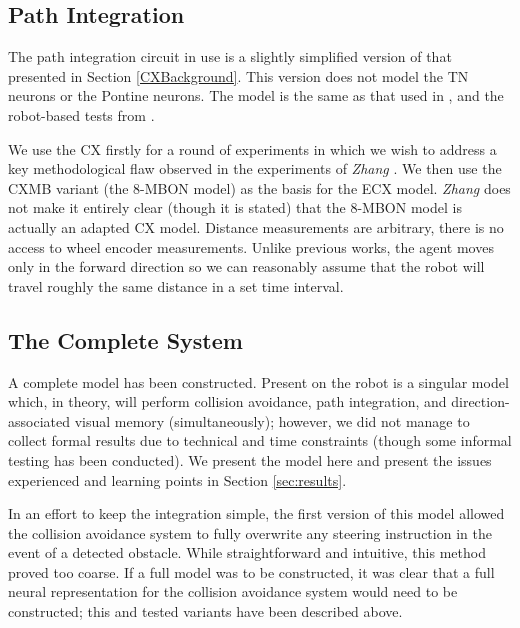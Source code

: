 \documentclass[a4paper,11pt,twoside,openright]{article}
\begin{document}
\subsection{ Path Integration }
The path integration circuit in use is a slightly simplified version of that
presented in Section \ref{CXBackground}. This version does not model the
TN neurons or the Pontine neurons. The model is the same as that used in
\cite{Scimeca2017, Zhang2017}, and the robot-based tests from \cite{Stone2017}.
\newline\par

We use the CX firstly for a round of experiments in which we wish to address a
key methodological flaw observed in the experiments of \textit{Zhang}
\cite{Zhang2017}. We then use the CXMB variant (the 8-MBON model)
as the basis for the ECX model. \textit{Zhang} does not make it entirely clear
(though it is stated) that the 8-MBON model is actually an adapted CX model.
Distance measurements are arbitrary, there is no access to wheel encoder
measurements. Unlike previous works, the agent moves only in the forward
direction so we can reasonably assume that the robot will travel roughly the same
distance in a set time interval.

\subsection{ The Complete System}
A complete model has been constructed. Present on the robot is a
singular model which, in theory, will perform collision avoidance,
path integration, and direction-associated visual memory
(simultaneously); however, we did not manage to collect formal results
due to technical and time constraints (though some informal testing
has been conducted). We present the model here and present the issues
experienced and learning points in Section \ref{sec:results}.
\newline\par

In an effort to keep the integration simple, the first version of this
model allowed the collision avoidance system to fully overwrite any
steering instruction in the event of a detected obstacle. While
straightforward and intuitive, this method proved too coarse. If a
full model was to be constructed, it was clear that a full neural
representation for the collision avoidance system would need to be
constructed; this and tested variants have been described above.
\newline\par
\end{document}
